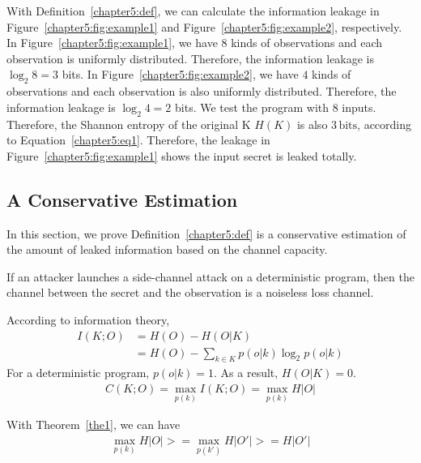 With Definition~\ref{chapter5:def}, we can calculate the information leakage in Figure~\ref{chapter5:fig:example1} and Figure~\ref{chapter5:fig:example2}, respectively. In Figure~\ref{chapter5:fig:example1}, we have $8$ kinds of observations and each observation is uniformly distributed. Therefore, the information leakage is $\log_2{8} = 3$ bits. In Figure~\ref{chapter5:fig:example2}, we have $4$ kinds of observations and each observation is also uniformly distributed. Therefore, the information leakage is $\log_2{4} = 2$ bits. We test the program with $8$ inputs. Therefore, the Shannon entropy of the original K $H(K)$ is also $3\,\mathrm{bits}$, according to Equation~\ref{chapter5:eq1}. Therefore, the leakage in Figure~\ref{chapter5:fig:example1} shows the input secret is leaked totally.

\subsection{A Conservative Estimation}
In this section, we prove Definition~\ref{chapter5:def} is a conservative estimation of the amount of leaked information based on the channel capacity.

\begin{theorem}\label{the1}
  If an attacker launches a side-channel attack on a deterministic program, then the channel between the secret and the observation is a noiseless loss channel.
\end{theorem}

\begin{myprof}
  According to information theory,
  \begin{align*}
    I(K;O) & = H(O) - H(O|K)                                \\
           & = H(O) - \sum_{k {\in} K }{p(o|k)\log_2p(o|k)}
  \end{align*}
  For a deterministic program, $p(o|k)=1$. As a result, $H(O|K) = 0$.
  \begin{align*}
    C(K;O) = \max_{p(k)} I(K;O) = \max_{p(k)} H |O|
  \end{align*}
\end{myprof}

With Theorem~\ref{the1}, we can have
\begin{align*}
  \max_{p(k)} H |O| >= \max_{p(k')} H |O'| >= H |O'|
\end{align*}

